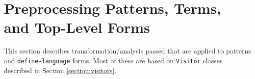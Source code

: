 \chapter{Preprocessing Patterns, Terms, and Top-Level Forms}

This section describes transformation/analysis passed that are applied to patterns and \texttt{define-language} forms. Most of these are based on \texttt{Visitor} classes described in Section \ref{section:visitors}.






%
%






